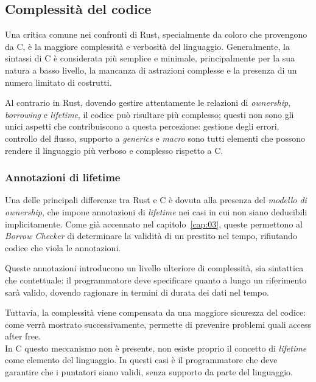 \subsection{Complessità del codice}
Una critica comune nei confronti di Rust, specialmente da coloro che provengono da C, è la maggiore complessità e verbosità del linguaggio.
Generalmente, la sintassi di C è considerata più semplice e minimale, principalmente per la sua natura a basso livello, la mancanza di astrazioni
complesse e la presenza di un numero limitato di costrutti.

Al contrario in Rust, dovendo gestire attentamente le relazioni di \textit{ownership}, \textit{borrowing} e \textit{lifetime}, il codice può risultare più complesso; 
questi non sono gli unici aspetti che contribuiscono a questa percezione: gestione degli errori, controllo del flusso, supporto a \textit{generics} e \textit{macro} sono
tutti elementi che possono rendere il linguaggio più verboso e complesso rispetto a C.

\subsubsection{Annotazioni di lifetime}
Una delle principali differenze tra Rust e C è dovuta alla presenza del \textit{modello di ownership}, che impone annotazioni di \textit{lifetime} nei casi in cui non siano deducibili implicitamente.
Come già accennato nel capitolo~\ref{cap:03}, queste permettono al \textit{Borrow Checker} di determinare la validità di un prestito nel tempo, rifiutando 
codice che viola le annotazioni.

Queste annotazioni introducono un livello ulteriore di complessità, sia sintattica che contettuale: il programmatore deve specificare quanto a lungo
un riferimento sarà valido, dovendo ragionare in termini di durata dei dati nel tempo.

Tuttavia, la complessità viene compensata da una maggiore sicurezza del codice: come verrà mostrato successivamente, permette di prevenire
problemi quali access after free. \hfill
\vspace{10pt} \\
\noindent In C questo meccanismo non è presente, non esiste proprio il concetto di \textit{lifetime} come elemento del linguaggio. In questi
casi è il programmatore che deve garantire che i puntatori siano validi, senza supporto da parte del linguaggio.

